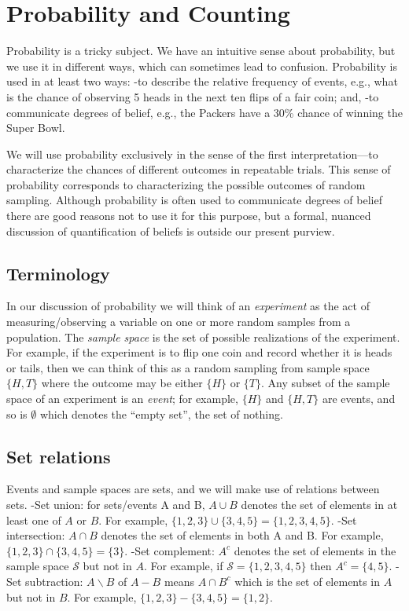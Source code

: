 \documentclass[]{book}
\begin{document}
\chapter{Probability and Counting}\label{probability-and-counting}

Probability is a tricky subject. We have an intuitive sense about
probability, but we use it in different ways, which can sometimes lead
to confusion. Probability is used in at least two ways: -to describe the
relative frequency of events, e.g., what is the chance of observing 5
heads in the next ten flips of a fair coin; and, -to communicate degrees
of belief, e.g., the Packers have a 30\% chance of winning the Super
Bowl.

We will use probability exclusively in the sense of the first
interpretation---to characterize the chances of different outcomes in
repeatable trials. This sense of probability corresponds to
characterizing the possible outcomes of random sampling. Although
probability is often used to communicate degrees of belief there are
good reasons not to use it for this purpose, but a formal, nuanced
discussion of quantification of beliefs is outside our present purview.

\section{Terminology}\label{terminology}

In our discussion of probability we will think of an \emph{experiment}
as the act of measuring/observing a variable on one or more random
samples from a population. The \emph{sample space} is the set of
possible realizations of the experiment. For example, if the experiment
is to flip one coin and record whether it is heads or tails, then we can
think of this as a random sampling from sample space \(\{H, T\}\) where
the outcome may be either \(\{H\}\) or \(\{T\}\). Any subset of the
sample space of an experiment is an \emph{event}; for example, \(\{H\}\)
and \(\{H,T\}\) are events, and so is \(\emptyset\) which denotes the
``empty set'', the set of nothing.

\section{Set relations}\label{set-relations}

Events and sample spaces are sets, and we will make use of relations
between sets. -Set union: for sets/events A and B, \(A\cup B\) denotes
the set of elements in at least one of \(A\) or \(B\). For example,
\(\{1,2,3\}\cup\{3,4,5\} = \{1,2,3,4,5\}\). -Set intersection:
\(A\cap B\) denotes the set of elements in both A and B. For example,
\(\{1,2,3\}\cap\{3,4,5\} = \{3\}\). -Set complement: \(A^c\) denotes the
set of elements in the sample space \(\mathcal{S}\) but not in \(A\).
For example, if \(\mathcal{S} = \{1,2,3,4,5\}\) then \(A^c = \{4,5\}\).
-Set subtraction: \(A\backslash B\) of \(A-B\) means \(A\cap B^c\) which
is the set of elements in \(A\) but not in \(B\). For example,
\(\{1,2,3\}-\{3,4,5\} = \{1,2\}\).\\
\end{document}
